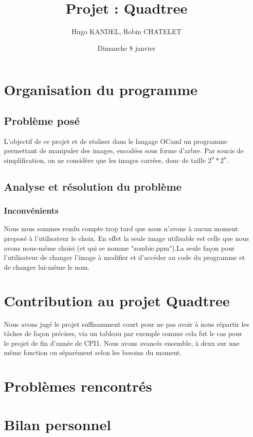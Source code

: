\documentclass[12pt,a4paper]{article}
\title{Projet : Quadtree}
\author{Hugo KANDEL, Robin CHATELET}
\date{Dimanche 8 janvier}
\begin{document}
\maketitle
\pagebreak
\newpage
\tableofcontents
\pagebreak
\newpage

\section{Organisation du programme}
\subsection{Problème posé}
L'objectif de ce projet et de réaliser dans le langage OCaml un programme permettant de manipuler des images, encodées sous forme d’arbre. Par soucis de simplification, on ne considère que les images carrées, donc de taille $2^n * 2^n$.
\subsection{Analyse et résolution du problème} 

\subsubsection{Inconvénients}
Nous nous sommes rendu compte trop tard que nous n'avons à aucun moment proposé à l'utilisateur le choix. En effet la seule image utilisable est celle que nous avons nous-même choisi (et qui se nomme "zombie.ppm").\newline La seule façon pour l'utilisateur de changer l'image à modifier et d'accéder au code du programme et de changer lui-même le nom.
\section{Contribution au projet Quadtree}
Nous avons jugé le projet suffisamment court pour ne pas avoir à nous répartir les tâches de façon précises, via un tableau par exemple comme cela fut le cas pour le projet de fin d'année de CPI1. Nous avons avancés ensemble, à deux sur une même fonction ou séparément selon les besoins du moment.
\section{Problèmes rencontrés}

\section{Bilan personnel}
\end{document}
